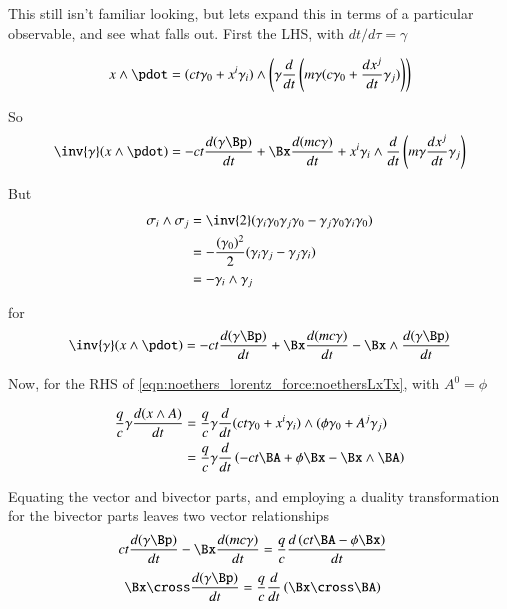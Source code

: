 This still isn't familiar looking, but lets expand this in terms of a particular observable, and see what falls out.  First the LHS, with $dt/d\tau = \gamma$

\begin{align*}
x \wedge \pdot &= (ct \gamma_0 + x^i \gamma_i) \wedge 
\left( \gamma \frac{d}{dt}\left( m \gamma (c \gamma_0 + \frac{dx^j}{dt} \gamma_j ) \right) \right) \\
\end{align*}

So
\begin{align*}
\inv{\gamma} (x \wedge \pdot)
&= 
- ct \frac{d (\gamma \Bp)}{dt}
+ \Bx \frac{d (m c \gamma)}{dt} 
+ x^i \gamma_i \wedge 
\frac{d}{dt}\left( m \gamma \frac{dx^j}{dt} \gamma_j \right) \\
\end{align*}

But
\begin{align*}
\sigma_i \wedge \sigma_j
&= \inv{2}( \gamma_i \gamma_0 \gamma_j \gamma_0 - \gamma_j \gamma_0 \gamma_i \gamma_0) \\
&= -\frac{(\gamma_0)^2}{2}( \gamma_i \gamma_j - \gamma_j \gamma_i ) \\
&= -\gamma_i \wedge \gamma_j \\
\end{align*}

for
\begin{align*}
\inv{\gamma} (x \wedge \pdot)
&= 
- ct \frac{d (\gamma \Bp)}{dt}
+ \Bx \frac{d (m c \gamma)}{dt} 
- \Bx \wedge \frac{d( \gamma \Bp )}{dt} \\
\end{align*}

Now, for the RHS of \ref{eqn:noethers_lorentz_force:noethersLxTx}, with $A^0 = \phi$

\begin{align*}
\frac{q}{c} \gamma \frac{d(x \wedge A)}{dt}
&= \frac{q}{c} \gamma \frac{d}{dt} (ct \gamma_0 + x^i \gamma_i) \wedge (\phi \gamma_0 + A^j \gamma_j) \\
&= \frac{q}{c} \gamma \frac{d}{dt} \left( -ct \BA + \phi \Bx - \Bx \wedge \BA \right)
\end{align*}

Equating the vector and bivector parts, and employing a duality transformation for the bivector parts leaves two vector relationships
\begin{align}\label{eqn:noethers_lorentz_force:boostresultspacetime}
ct \frac{d (\gamma \Bp)}{dt} - \Bx \frac{d (m c \gamma)}{dt} &= \frac{q}{c} \frac{d \left( ct \BA - \phi \Bx \right) }{dt}
\end{align}
\begin{align}\label{eqn:noethers_lorentz_force:rotation}
\Bx \cross \frac{d( \gamma \Bp )}{dt} &= \frac{q}{c} \frac{d}{dt} \left( \Bx \cross \BA \right)
\end{align}


